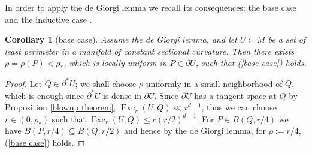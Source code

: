 \documentclass[reqno,10pt]{amsart}
\DeclareMathOperator{\Exc}{Exc}
\newtheorem{corollary}[theorem]{Corollary}
\theoremstyle{definition}
\numberwithin{equation}{section}
\begin{document}
In order to apply the de Giorgi lemma we recall its consequences: the base case \cite[pg109]{Giusti77} and the inductive case \cite[Corollary 8.3]{Giusti77}.

\begin{corollary}[base case]
Assume the de Giorgi lemma, and let $U \subset M$ be a set of least perimeter in a manifold of constant sectional curvature.
Then there exists $\rho  = \rho(P) < \rho_*$, which is locally uniform in $P \in \partial U$, such that (\ref{base case}) holds.
\end{corollary}
\begin{proof}
Let $Q \in \partial^* U$; we shall choose $\rho$ uniformly in a small neighborhood of $Q$, which is enough since $\partial^* U$ is dense in $\partial U$.
Since $\partial U$ has a tangent space at $Q$ by Proposition \ref{blowup theorem}, $\Exc_r(U, Q) \ll r^{d - 1}$, thus we can choose $r \in (0, \rho_*)$ such that $\Exc_r(U, Q) \leq c(r/2)^{d - 1}$.
For $P \in B(Q, r/4)$ we have $B(P, r/4) \subseteq B(Q, r/2)$ and hence by the de Giorgi lemma, for $\rho := r/4$, (\ref{base case}) holds.
\end{proof}
\end{document}
